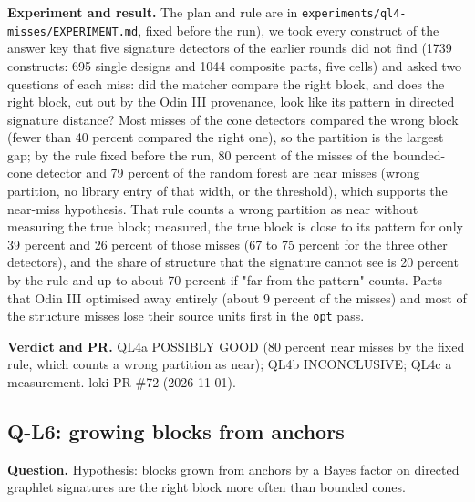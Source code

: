 \documentclass[conference]{IEEEtran}
\newcommand{\hev}[1]{\par\smallskip\noindent\textbf{#1}}
\newcommand{\code}[1]{\texttt{#1}}
\begin{document}
\hev{Experiment and result.} The plan and rule are in \code{experiments/ql4-misses/EXPERIMENT.md}, fixed before the run), we took every
construct of the answer key that five signature detectors of the earlier rounds did not find (1739 constructs: 695 single designs and 1044 composite parts, five cells)
and asked two questions of each miss: did the matcher compare the right block, and does the right block, cut out by the Odin III provenance, look like its pattern
in directed signature distance? Most misses of the cone detectors compared the wrong block (fewer than 40 percent compared the right one), so the partition is the largest
gap; by the rule fixed before the run, 80 percent of the misses of the bounded-cone detector and 79 percent of the random forest are near misses (wrong partition,
no library entry of that width, or the threshold), which supports the near-miss hypothesis. That rule counts a wrong partition as near without measuring the true block;
measured, the true block is close to its pattern for only 39 percent and 26 percent of those misses (67 to 75 percent for the three other detectors), and
the share of structure that the signature cannot see is 20 percent by the rule and up to about 70 percent if "far from the pattern" counts. Parts that Odin III
optimised away entirely (about 9 percent of the misses) and most of the structure misses lose their source units first in the \code{opt} pass.

\hev{Verdict and PR.} QL4a POSSIBLY GOOD (80 percent near misses by the fixed rule, which counts a wrong partition as near); QL4b INCONCLUSIVE; QL4c a measurement. loki PR \#72 (2026-11-01).

\subsection{Q-L6: growing blocks from anchors}
\label{rec:ql6}

\hev{Question.} Hypothesis: blocks grown from anchors by a Bayes factor on directed graphlet signatures are the right block more often than bounded cones.
\end{document}
